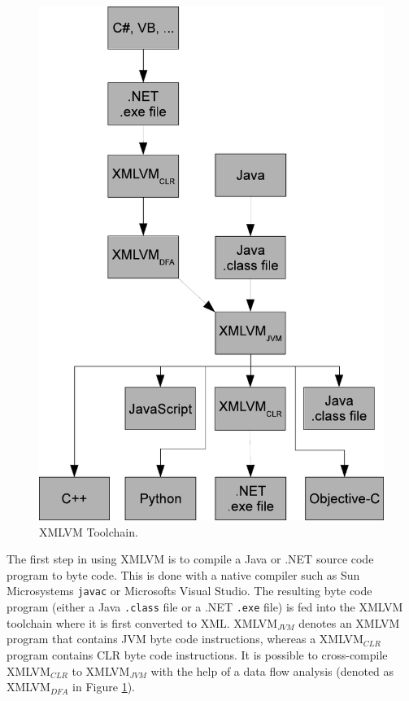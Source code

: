 \documentclass[11pt]{book}
\begin{document}
\begin{figure}
\includegraphics{pics/xmlvm_toolchain.pdf}
\caption{\label{FIG_XMLVM_TOOLCHAIN} XMLVM Toolchain.}
\end{figure}

The first step in using XMLVM is to compile a Java or .NET source code
program to byte code. This is done with a native compiler such as Sun
Microsystems \texttt{javac} or Microsofts Visual Studio. The resulting
byte code program (either a Java \texttt{.class} file or a .NET
\texttt{.exe} file) is fed into the XMLVM toolchain where it is first
converted to XML. XMLVM$_{JVM}$ denotes an XMLVM program that contains
JVM byte code instructions, whereas a XMLVM$_{CLR}$ program contains
CLR byte code instructions. It is possible to cross-compile
XMLVM$_{CLR}$ to XMLVM$_{JVM}$ with the help of a data flow analysis
(denoted as XMLVM$_{DFA}$ in Figure \ref{FIG_XMLVM_TOOLCHAIN}).
\end{document}
